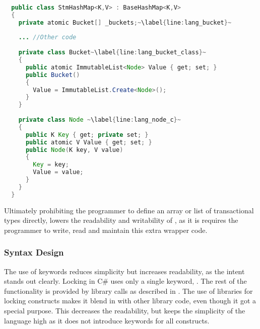 \begin{lstlisting}[float,label=lst:lang_Buckets,
  caption={HashMap Buckets Array - \stmname},
  language=Java,  
  showspaces=false,
  showtabs=false,
  breaklines=true,
  showstringspaces=false,
  breakatwhitespace=true,
  escapechar=~,
  commentstyle=\color{greencomments},
  keywordstyle=\color{bluekeywords},
  stringstyle=\color{redstrings},
  morekeywords={atomic, retry, orelse, var, get, set, ref, out}]  % Start your code-block
  
  public class StmHashMap<K,V> : BaseHashMap<K,V>
  {
    private atomic Bucket[] _buckets;~\label{line:lang_bucket}~
  
    ... //Other code
    
    private class Bucket~\label{line:lang_bucket_class}~
    {
      public atomic ImmutableList<Node> Value { get; set; }
      public Bucket()
      {
        Value = ImmutableList.Create<Node>();
      }
    }
  
    private class Node ~\label{line:lang_node_c}~
    {
      public K Key { get; private set; }
      public atomic V Value { get; set; }
      public Node(K key, V value)
      {
        Key = key;
        Value = value;
      }
    }
  }
\end{lstlisting}

Ultimately prohibiting the programmer to define an array or list of transactional types directly, lowers the readability and writability of \stmname, as it is requires the programmer to write, read and maintain this extra wrapper code.

\subsubsection{Syntax Design}\label{subsec:syntaxdesign}
The use of keywords reduces simplicity but increases readability, as the intent stands out clearly\cite[p. 12-13]{sebestaProLang}. Locking in C\# uses only a single keyword, . The rest of the functionality is provided by library calls as described in . The use of libraries for locking constructs makes it blend in with other library code, even though it got a special purpose. This decreases the readability, but keeps the simplicity of the language high as it does not introduce keywords for all constructs. 

